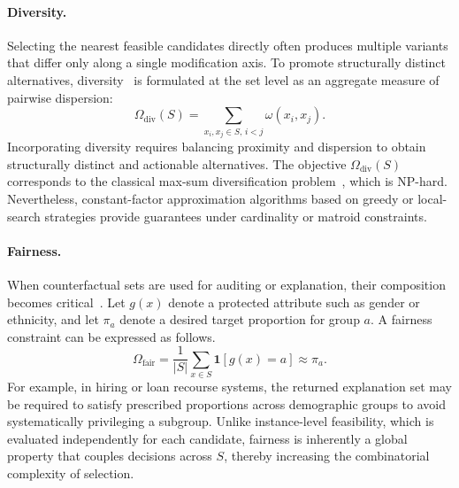 \paragraph{Diversity.}
Selecting the nearest feasible candidates directly often produces multiple variants that differ only along a single modification axis. To promote structurally distinct alternatives, diversity~\cite{laugel2023achieving} is formulated at the set level as an aggregate measure of pairwise dispersion:
\begingroup\small
\begin{equation}
    \Omega_{\text{div}}(S) 
    = \sum_{x_i, x_j \in S,\, i<j} \omega(x_i, x_j).
\end{equation}
\endgroup
Incorporating diversity requires balancing proximity and dispersion to obtain structurally distinct and actionable alternatives. The objective $\Omega_{\text{div}}(S)$ corresponds to the classical max-sum diversification problem~\cite{borodin2017max}, which is NP-hard. Nevertheless, constant-factor approximation algorithms based on greedy or local-search strategies provide guarantees under cardinality or matroid constraints.

\paragraph{Fairness.}
When counterfactual sets are used for auditing or explanation, their composition becomes critical~\cite{kusner2017counterfactual}. Let $g(x)$ denote a protected attribute such as gender or ethnicity, and let $\pi_a$ denote a desired target proportion for group $a$. A fairness constraint can be expressed as follows.
\begingroup\small
\begin{equation}
\Omega_{\text{fair}}=\frac{1}{|S|}\sum_{x\in S}\mathbf{1}[g(x)=a] \approx \pi_a .
\end{equation}
\endgroup
For example, in hiring or loan recourse systems, the returned explanation set may be required to satisfy prescribed proportions across demographic groups to avoid systematically privileging a subgroup. Unlike instance-level feasibility, which is evaluated independently for each candidate, fairness is inherently a global property that couples decisions across $S$, thereby increasing the combinatorial complexity of selection.

